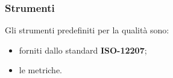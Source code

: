 	\subsubsection{Strumenti}
	Gli strumenti predefiniti per la qualità sono: 
	\begin{itemize}
		\item forniti dallo standard \textbf{ISO-12207};
		\item le metriche.
	\end{itemize}

